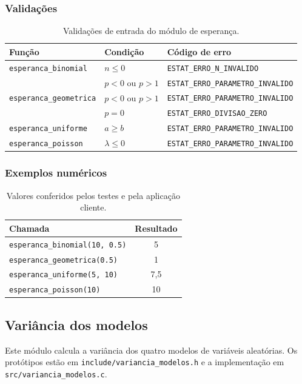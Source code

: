 \documentclass[12pt,a4paper]{article}
\newcommand{\cod}[1]{\texttt{#1}}
\begin{document}
\subsubsection{Validações}
\begin{table}[h]
\centering
\small
\begin{tabular}{@{}lll@{}}
\toprule
Função & Condição & Código de erro \\
\midrule
\cod{esperanca\_binomial}   & $n \le 0$          & \cod{ESTAT\_ERRO\_N\_INVALIDO} \\
                            & $p < 0$ ou $p > 1$ & \cod{ESTAT\_ERRO\_PARAMETRO\_INVALIDO} \\
\cod{esperanca\_geometrica} & $p < 0$ ou $p > 1$ & \cod{ESTAT\_ERRO\_PARAMETRO\_INVALIDO} \\
                            & $p = 0$            & \cod{ESTAT\_ERRO\_DIVISAO\_ZERO} \\
\cod{esperanca\_uniforme}   & $a \ge b$          & \cod{ESTAT\_ERRO\_PARAMETRO\_INVALIDO} \\
\cod{esperanca\_poisson}    & $\lambda \le 0$    & \cod{ESTAT\_ERRO\_PARAMETRO\_INVALIDO} \\
\bottomrule
\end{tabular}
\caption{Validações de entrada do módulo de esperança.}
\end{table}

\subsubsection{Exemplos numéricos}
\begin{table}[h]
\centering
\begin{tabular}{@{}lc@{}}
\toprule
Chamada & Resultado \\
\midrule
\cod{esperanca\_binomial(10, 0.5)} & 5 \\
\cod{esperanca\_geometrica(0.5)}   & 1 \\
\cod{esperanca\_uniforme(5, 10)}   & 7,5 \\
\cod{esperanca\_poisson(10)}       & 10 \\
\bottomrule
\end{tabular}
\caption{Valores conferidos pelos testes e pela aplicação cliente.}
\end{table}
\subsection{Variância dos modelos}
\label{sec:variancia}
Este módulo calcula a variância dos quatro modelos de variáveis aleatórias. Os protótipos estão em
\cod{include/variancia\_modelos.h} e a implementação em
\cod{src/variancia\_modelos.c}.
\end{document}
